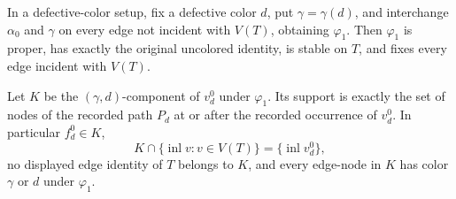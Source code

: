 \begin{helper}
In a defective-color setup, fix a defective color $d$, put
$\gamma=\gamma( d)$, and interchange $\alpha_0$ and $\gamma$ on every
edge not incident with $V(T)$, obtaining $\varphi_1$.  Then
$\varphi_1$ is proper, has exactly the original uncolored identity, is
stable on $T$, and fixes every edge incident with $V(T)$.

Let $K$ be the $(\gamma,d)$-component of $v^0_d$ under $\varphi_1$.
Its support is exactly the set of nodes of the recorded path $P_d$ at or
after the recorded occurrence of $v^0_d$.  In particular $f^0_d\in K$,
\[
 K\cap\{\operatorname{inl}v:v\in V(T)\}
   =\{\operatorname{inl}v^0_d\},
\]
no displayed edge identity of $T$ belongs to $K$, and every edge-node in
$K$ has color $\gamma$ or $d$ under $\varphi_1$.
\end{helper}
